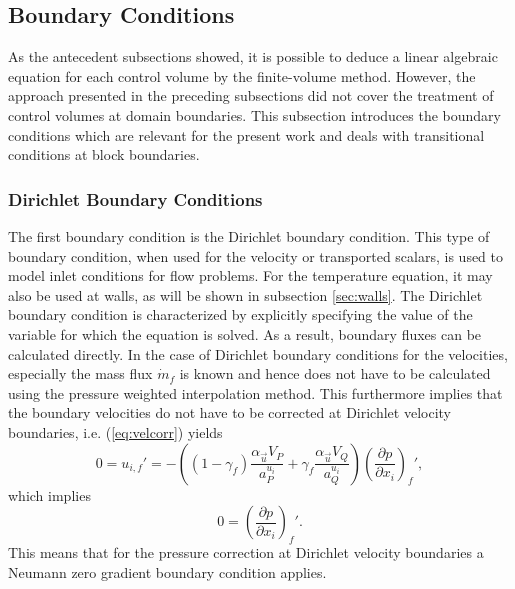 \subsection{Boundary Conditions}
\label{sec:segboundary}

As the antecedent subsections showed, it is possible to deduce a linear algebraic equation for each control volume by the finite-volume method. However, the approach presented in the preceding subsections did not cover the treatment of control volumes at domain boundaries. This subsection introduces the boundary conditions which are relevant for the present work and deals with transitional conditions at block boundaries.

\subsubsection{Dirichlet Boundary Conditions}
\label{sec:segDirichlet}

The first boundary condition is the Dirichlet boundary condition. This type of boundary condition, when used for the velocity or transported scalars, is used to model inlet conditions for flow problems. For the temperature equation, it may also be used at walls, as will be shown in subsection \ref{sec:walls}. The Dirichlet boundary condition is characterized by explicitly specifying the value of the variable for which the equation is solved. As a result, boundary fluxes can be calculated directly. In the case of Dirichlet boundary conditions for the velocities, especially the mass flux \(\dot{m}_f\) is known and hence does not have to be calculated using the pressure weighted interpolation method. This furthermore implies that the boundary velocities do not have to be corrected at Dirichlet velocity boundaries, i.e. (\ref{eq:velcorr}) yields
\begin{displaymath}
  0 
  =
  u_{i,f}' 
  = 
  - \left(\left(1 - \gamma_f\right) \frac{\alpha_\vec{u} V_P}{a_P^{u_i}} + \gamma_f \frac{\alpha_\vec{u} V_Q}{a_Q^{u_i}}\right)
  \left(\frac{\partial p}{\partial x_i}\right)_f',
\end{displaymath}
which implies
\begin{displaymath}
  0 = \left(\frac{\partial p}{\partial x_i}\right)_f'.
\end{displaymath}
This means that for the pressure correction at Dirichlet velocity boundaries a Neumann zero gradient boundary condition applies.


